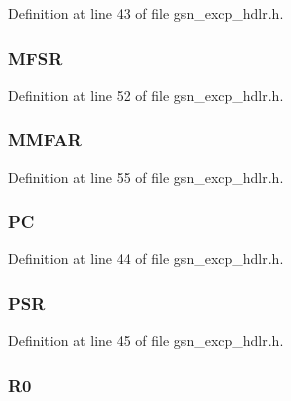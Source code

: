 Definition at line 43 of file gsn\_\-excp\_\-hdlr.h.

\hypertarget{a00070_a4063c5155a72383a23b224d48946c543}{
\subsubsection[{MFSR}]{ {\bf MFSR}}}
\label{a00070_a4063c5155a72383a23b224d48946c543}


Definition at line 52 of file gsn\_\-excp\_\-hdlr.h.

\hypertarget{a00070_a15d381a8eeb8f08429531da2f388315c}{
\subsubsection[{MMFAR}]{ {\bf MMFAR}}}
\label{a00070_a15d381a8eeb8f08429531da2f388315c}


Definition at line 55 of file gsn\_\-excp\_\-hdlr.h.

\hypertarget{a00070_adf3232a3532df46f7f49588de9eee0c8}{
\subsubsection[{PC}]{ {\bf PC}}}
\label{a00070_adf3232a3532df46f7f49588de9eee0c8}


Definition at line 44 of file gsn\_\-excp\_\-hdlr.h.

\hypertarget{a00070_a2ee4f6874fac915777bdfe3c85df3e5c}{
\subsubsection[{PSR}]{ {\bf PSR}}}
\label{a00070_a2ee4f6874fac915777bdfe3c85df3e5c}


Definition at line 45 of file gsn\_\-excp\_\-hdlr.h.

\hypertarget{a00070_a559e4af7b29c84dda7f3a90f70dd5e08}{
\subsubsection[{R0}]{ {\bf R0}}}
\label{a00070_a559e4af7b29c84dda7f3a90f70dd5e08}


